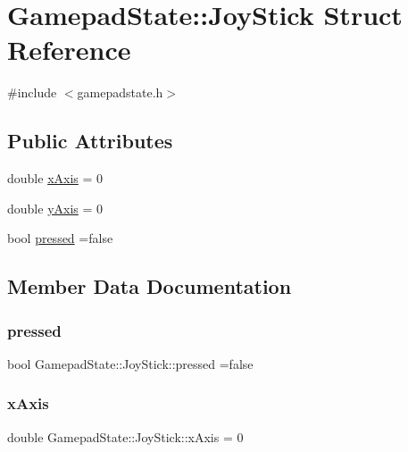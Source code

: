 \hypertarget{struct_gamepad_state_1_1_joy_stick}{}\section{Gamepad\+State\+:\+:Joy\+Stick Struct Reference}
\label{struct_gamepad_state_1_1_joy_stick}


{\ttfamily \#include $<$gamepadstate.\+h$>$}

\subsection*{Public Attributes}
\begin{DoxyCompactItemize}
\item 
double \mbox{\hyperlink{struct_gamepad_state_1_1_joy_stick_a7d18ff7c270e84d4b1f31674955d01bf}{x\+Axis}} = 0
\item 
double \mbox{\hyperlink{struct_gamepad_state_1_1_joy_stick_ac270eec038132bdc0364968568df9516}{y\+Axis}} = 0
\item 
bool \mbox{\hyperlink{struct_gamepad_state_1_1_joy_stick_accb227b64d52188bf52a67446a974348}{pressed}} =false
\end{DoxyCompactItemize}


\subsection{Member Data Documentation}
\mbox{\label{struct_gamepad_state_1_1_joy_stick_accb227b64d52188bf52a67446a974348}} 
\subsubsection{\texorpdfstring{pressed}{pressed}}
{\footnotesize\ttfamily bool Gamepad\+State\+::\+Joy\+Stick\+::pressed =false}

\mbox{\label{struct_gamepad_state_1_1_joy_stick_a7d18ff7c270e84d4b1f31674955d01bf}} 
\subsubsection{\texorpdfstring{x\+Axis}{xAxis}}
{\footnotesize\ttfamily double Gamepad\+State\+::\+Joy\+Stick\+::x\+Axis = 0}

